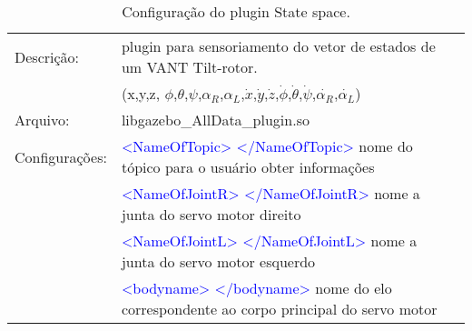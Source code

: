 		\begin{table}[h]
		\centering
		\begin{tabular}{|r|lr|}
		\hline
		\multicolumn{1}{|l|}{Descrição: } & plugin para sensoriamento do vetor de estados de um VANT Tilt-rotor. &                \\
		& (x,y,z, $\phi$,$\theta$,$\psi$,$\alpha_R$,$\alpha_L$,$\dot{x}$,$\dot{y}$,$\dot{z}$,$\dot{\phi}$,$\dot{\theta}$,$\dot{\psi}$,$\dot{\alpha_R}$,$\dot{\alpha_L}$) 
		&             \\
		\hline
		\multicolumn{1}{|l|}{Arquivo: } & libgazebo\_AllData\_plugin.so &             \\
		\hline
		\multicolumn{1}{|l|}{Configurações: } & \textcolor{blue}{<NameOfTopic> </NameOfTopic>} nome do tópico para o usuário obter informações &        \\
		& \textcolor{blue}{<NameOfJointR> </NameOfJointR>} nome a junta do servo motor direito &            \\
		& \textcolor{blue}{<NameOfJointL> </NameOfJointL>} nome a junta do servo motor esquerdo &             \\
		& \textcolor{blue}{<bodyname> </bodyname>} nome do elo correspondente ao corpo principal do servo motor &        \\
		\hline
		\end{tabular}%
		\caption{Configuração do plugin State space.}
		\label{tab:Statespace}%
		\end{table}%
